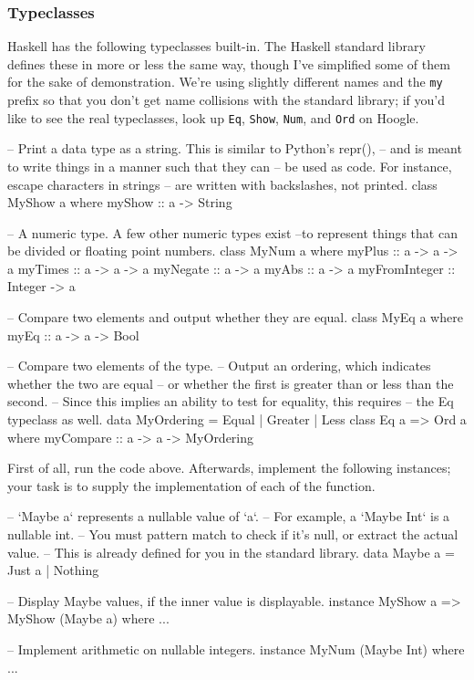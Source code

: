 \documentclass{article}
\begin{document}
\newpage
\subsubsection*{Typeclasses}

Haskell has the following typeclasses built-in. The Haskell standard library defines these in more
or less the same way, though I've simplified some of them for the sake of demonstration. We're using
slightly different names and the \texttt{my} prefix so that you don't get name collisions with the
standard library; if you'd like to see the real typeclasses, look up \texttt{Eq}, \texttt{Show},
\texttt{Num}, and \texttt{Ord} on Hoogle.
\begin{haskellcode}
-- Print a data type as a string. This is similar to Python's repr(),
-- and is meant to write things in a manner such that they can
-- be used as code. For instance, escape characters in strings
-- are written with backslashes, not printed.
class MyShow a where
  myShow :: a -> String

-- A numeric type. A few other numeric types exist 
--to represent things that can be divided or floating point numbers.
class MyNum a where
  myPlus :: a -> a -> a
  myTimes :: a -> a -> a
  myNegate :: a -> a
  myAbs :: a -> a
  myFromInteger :: Integer -> a

-- Compare two elements and output whether they are equal.
class MyEq a where
  myEq :: a -> a -> Bool

-- Compare two elements of the type.
-- Output an ordering, which indicates whether the two are equal
-- or whether the first is greater than or less than the second.
-- Since this implies an ability to test for equality, this requires
-- the Eq typeclass as well.
data MyOrdering = Equal | Greater | Less
class Eq a => Ord a where
  myCompare :: a -> a -> MyOrdering
\end{haskellcode}

First of all, run the code above. Afterwards, implement the following instances; your task is to
supply the implementation of each of the function.

\begin{haskellcode}
-- `Maybe a` represents a nullable value of `a`.
-- For example, a `Maybe Int` is a nullable int.
-- You must pattern match to check if it's null, or extract the actual value.
-- This is already defined for you in the standard library.
data Maybe a = Just a | Nothing

-- Display Maybe values, if the inner value is displayable.
instance MyShow a => MyShow (Maybe a) where
  ...

-- Implement arithmetic on nullable integers.
instance MyNum (Maybe Int) where
  ...
\end{haskellcode}
\end{document}
